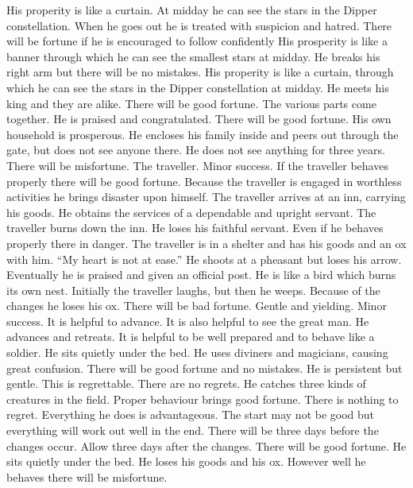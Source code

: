 	{His properity is like a curtain. At midday he can see the stars in the Dipper constellation. When he goes
		out he is treated with suspicion and hatred. There will be fortune if he is encouraged to
		follow confidently}
	{His prosperity is like a banner through which he can see the smallest stars at midday. He breaks his
		right arm but there will be no mistakes.}
	{His properity is like a curtain, through which he can see the stars in the Dipper constellation at
		midday. He meets his king and they are alike. There will be good fortune.}
	{The various parts come together. He is praised and congratulated. There will be good fortune.}
	{His own household is prosperous. He encloses his family inside and peers out through the gate, but does
		not see anyone there. He does not see anything for three years. There will be misfortune.}
\or {}
	{The traveller. Minor success. If the traveller behaves properly there will be good fortune.}
	{Because the traveller is engaged in worthless activities he brings disaster upon himself.}
	{The traveller arrives at an inn, carrying his goods. He obtains the services of a dependable and
		upright servant.}
	{The traveller burns down the inn. He loses his faithful servant. Even if he behaves properly there
		in danger.}
	{The traveller is in a shelter and has his goods and an ox with him. ``My heart is not at ease.''}
	{He shoots at a pheasant but loses his arrow. Eventually he is praised and given an official post.}
	{He is like a bird which burns its own nest. Initially the traveller laughs, but then he weeps. Because
		of the changes he loses his ox. There will be bad fortune.}
\or {}
	{Gentle and yielding. Minor success. It is helpful to advance. It is also helpful to see the great man.}
	{He advances and retreats. It is helpful to be well prepared and to behave like a soldier.}
	{He sits quietly under the bed. He uses diviners and magicians, causing great confusion. There
		will be good fortune and no mistakes.}
	{He is persistent but gentle. This is regrettable.}
	{There are no regrets. He catches three kinds of creatures in the field.}
	{Proper behaviour brings good fortune. There is nothing to regret. Everything he does is advantageous.
		The start may not be good but everything will work out well in the end. There will be three days
		before the changes occur. Allow three days after the changes. There will be good fortune.}
	{He sits quietly under the bed. He loses his goods and his ox. However well he behaves there will
		be misfortune.}
\or {}
